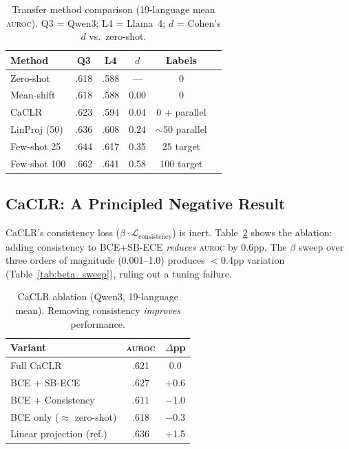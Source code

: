 \documentclass[11pt,a4paper]{article}
\newcommand{\auroc}{\textsc{auroc}}
\begin{document}
\begin{table}[t]
\centering
\small
\setlength{\tabcolsep}{3pt}
\begin{tabular}{@{}lccccl@{}}
\toprule
\textbf{Method} & \textbf{Q3} & \textbf{L4} & \textbf{$d$} & \textbf{Labels} \\
\midrule
Zero-shot & .618 & .588 & — & 0 \\
Mean-shift & .618 & .588 & 0.00 & 0 \\
CaCLR & .623 & .594 & 0.04 & 0 + parallel \\
LinProj (50) & .636 & .608 & 0.24 & $\sim$50 parallel \\
Few-shot 25 & .644 & .617 & 0.35 & 25 target \\
Few-shot 100 & .662 & .641 & 0.58 & 100 target \\
\bottomrule
\end{tabular}
\caption{Transfer method comparison (19-language mean \auroc{}). Q3 = Qwen3; L4 = Llama~4; $d$ = Cohen's $d$ vs.\ zero-shot.}
\label{tab:methods}
\end{table}

\subsection{CaCLR: A Principled Negative Result}
\label{sec:caclr}

CaCLR's consistency loss ($\beta \cdot \mathcal{L}_{\text{consistency}}$) is inert. Table~\ref{tab:caclr_ablation} shows the ablation: adding consistency to BCE+SB-ECE \emph{reduces} \auroc{} by 0.6pp. The $\beta$ sweep over three orders of magnitude (0.001--1.0) produces $<$0.4pp variation (Table~\ref{tab:beta_sweep}), ruling out a tuning failure.

\begin{table}[t]
\centering
\small
\begin{tabular}{@{}lcc@{}}
\toprule
\textbf{Variant} & \textbf{\auroc{}} & \textbf{$\Delta$pp} \\
\midrule
Full CaCLR & .621 & 0.0 \\
BCE + SB-ECE & .627 & $+$0.6 \\
BCE + Consistency & .611 & $-$1.0 \\
BCE only ($\approx$ zero-shot) & .618 & $-$0.3 \\
Linear projection (ref.) & .636 & $+$1.5 \\
\bottomrule
\end{tabular}
\caption{CaCLR ablation (Qwen3, 19-language mean). Removing consistency \emph{improves} performance.}
\label{tab:caclr_ablation}
\end{table}
\end{document}

